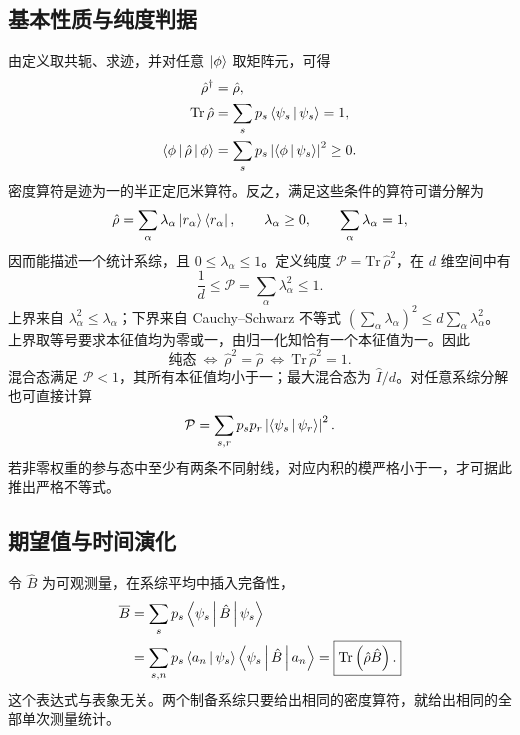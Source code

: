 \subsection{基本性质与纯度判据}
由定义取共轭、求迹，并对任意 $\Ket{\phi}$ 取矩阵元，可得
\begin{align}
\hat\rho^\dagger&=\hat\rho,\\
\mathrm{Tr}\,\hat\rho&=\sum_s p_s\Braket{\psi_s|\psi_s}=1,\\
\Braket{\phi|\hat\rho|\phi}&=\sum_s p_s\left|\Braket{\phi|\psi_s}\right|^2\geq0.
\end{align}
密度算符是迹为一的半正定厄米算符。反之，满足这些条件的算符可谱分解为
\begin{equation}
\hat\rho=\sum_\alpha\lambda_\alpha\Ket{r_\alpha}\Bra{r_\alpha},\qquad
\lambda_\alpha\geq0,\qquad\sum_\alpha\lambda_\alpha=1,
\end{equation}
因而能描述一个统计系综，且 $0\leq\lambda_\alpha\leq1$。定义纯度 $\mathcal P=\mathrm{Tr}\,\hat\rho^2$，在 $d$ 维空间中有
\begin{equation}
\boxed{\frac1d\leq\mathcal P=\sum_\alpha\lambda_\alpha^2\leq1.}
\end{equation}
上界来自 $\lambda_\alpha^2\leq\lambda_\alpha$；下界来自 Cauchy--Schwarz 不等式
$\left(\sum_\alpha\lambda_\alpha\right)^2\leq d\sum_\alpha\lambda_\alpha^2$。
上界取等号要求本征值均为零或一，由归一化知恰有一个本征值为一。因此
\begin{equation}
\boxed{\text{纯态}\ \Longleftrightarrow\ \hat\rho^2=\hat\rho
\ \Longleftrightarrow\ \mathrm{Tr}\,\hat\rho^2=1.}
\end{equation}
混合态满足 $\mathcal P<1$，其所有本征值均小于一；最大混合态为 $\hat I/d$。对任意系综分解也可直接计算
\begin{equation}
\mathcal P=\sum_{s,r}p_sp_r\left|\Braket{\psi_s|\psi_r}\right|^2.
\end{equation}
若非零权重的参与态中至少有两条不同射线，对应内积的模严格小于一，才可据此推出严格不等式。

\subsection{期望值与时间演化}
令 $\hat B$ 为可观测量，在系综平均中插入完备性，
\begin{align}
\overline B&=\sum_s p_s\Braket{\psi_s|\hat B|\psi_s}\notag\\
&=\sum_{s,n}p_s\Braket{a_n|\psi_s}\Braket{\psi_s|\hat B|a_n}
=\boxed{\mathrm{Tr}\left(\hat\rho\hat B\right).}
\end{align}
这个表达式与表象无关。两个制备系综只要给出相同的密度算符，就给出相同的全部单次测量统计。

